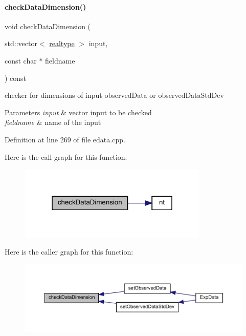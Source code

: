 \paragraph{\texorpdfstring{check\+Data\+Dimension()}{checkDataDimension()}}
{\footnotesize\ttfamily void check\+Data\+Dimension (\begin{DoxyParamCaption}\item[{std\+::vector$<$ \mbox{\hyperlink{namespaceamici_a1bdce28051d6a53868f7ccbf5f2c14a3}{realtype}} $>$}]{input,  }\item[{const char $\ast$}]{fieldname }\end{DoxyParamCaption}) const\hspace{0.3cm}{\ttfamily [protected]}}

checker for dimensions of input observed\+Data or observed\+Data\+Std\+Dev


\begin{DoxyParams}{Parameters}
{\em input} & vector input to be checked \\
\hline
{\em fieldname} & name of the input \\
\hline
\end{DoxyParams}


Definition at line 269 of file edata.\+cpp.

Here is the call graph for this function\+:
\nopagebreak
\begin{figure}[H]
\begin{center}
\leavevmode
\includegraphics[width=255pt]{classamici_1_1_exp_data_acad115e928a8b0bc8e90ebf9553d3eed_cgraph}
\end{center}
\end{figure}
Here is the caller graph for this function\+:
\nopagebreak
\begin{figure}[H]
\begin{center}
\leavevmode
\includegraphics[width=350pt]{classamici_1_1_exp_data_acad115e928a8b0bc8e90ebf9553d3eed_icgraph}
\end{center}
\end{figure}
\mbox{\label{classamici_1_1_exp_data_adcf5587f972fdef595fff78123f5118a}} 
